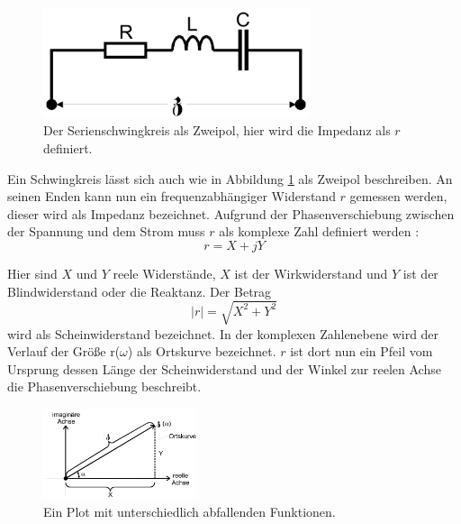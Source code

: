         
        \begin{figure}[H]
            \centering
            \includegraphics[width=0.7\textwidth]{images/Zweipol.PNG}
            \caption{Der Serienschwingkreis als Zweipol, hier wird die Impedanz als $r$ definiert.}
            \label{img:zweip}
        \end{figure}

    \noindent Ein Schwingkreis lässt sich auch wie in Abbildung \ref{img:zweip} als Zweipol beschreiben. An seinen Enden kann nun ein 
    frequenzabhängiger Widerstand $r$ gemessen werden, dieser wird als Impedanz bezeichnet. Aufgrund der Phasenverschiebung zwischen der Spannung 
    und dem Strom muss $r$ als komplexe Zahl definiert werden :
    \begin{equation}
        r = X + jY \nonumber
    \end{equation}

    \noindent Hier sind $X$ und $Y$ reele Widerstände, $X$ ist  der Wirkwiderstand und $Y$ ist der Blindwiderstand oder die Reaktanz. Der Betrag
    \begin{equation}
        |r| = \sqrt{X^2 + Y^2} \nonumber
    \end{equation}
    \noindent wird als Scheinwiderstand bezeichnet. In der komplexen Zahlenebene wird der Verlauf der Größe r($\omega$) als Ortskurve bezeichnet. 
    $r$ ist dort nun ein Pfeil vom Ursprung dessen Länge der Scheinwiderstand und der Winkel zur reelen Achse die Phasenverschiebung 
    beschreibt.

    \begin{figure}[H]
        \centering
        \includegraphics[width=0.4\textwidth]{images/Imaginaer.PNG}
        \caption{Ein Plot mit unterschiedlich abfallenden Funktionen.}
        \label{img:imag}
    \end{figure}

